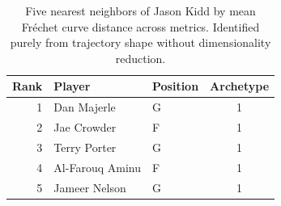\begin{table}[htbp]
  \centering\small
  \begin{tabular}{rllc}
    \toprule
    Rank & Player & Position & Archetype \\
    \midrule
    1 & Dan Majerle & G & 1 \\
    2 & Jae Crowder & F & 1 \\
    3 & Terry Porter & G & 1 \\
    4 & Al-Farouq Aminu & F & 1 \\
    5 & Jameer Nelson & G & 1 \\
    \bottomrule
  \end{tabular}
  \caption{Five nearest neighbors of Jason Kidd by mean Fr\'{e}chet curve distance across metrics. Identified purely from trajectory shape without dimensionality reduction.}
  \label{tab:Jason_Kidd_frechet_curve_neighbors}
\end{table}

